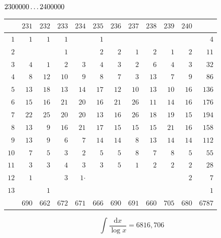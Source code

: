 \par\medskip
\noindent\begin{minipage}{\linewidth}\centering
{}
\(2300000\mathinner{.\,.\,.}2400000\)\par\smallskip
\begingroup\fontsize{10.5}{11.5}\selectfont\setlength{\tabcolsep}{3.5pt}\renewcommand{\arraystretch}{1}
\begin{tabular}{r|rrrrrrrrrr|r}\hline
 & $231$ & $232$ & $233$ & $234$ & $235$ & $236$ & $237$ & $238$ & $239$ & $240$ &  \\ \hline
$1$ & $1$ & $1$ & $1$ &  & $1$ &  &  &  &  &  & $4$ \\
$2$ &  &  & $1$ &  & $2$ & $2$ & $1$ & $2$ & $1$ & $2$ & $11$ \\
$3$ & $4$ & $1$ & $2$ & $3$ & $4$ & $3$ & $2$ & $6$ & $4$ & $3$ & $32$ \\
$4$ & $8$ & $12$ & $10$ & $9$ & $8$ & $7$ & $3$ & $13$ & $7$ & $9$ & $86$ \\
$5$ & $13$ & $18$ & $13$ & $14$ & $17$ & $12$ & $10$ & $13$ & $10$ & $16$ & $136$ \\
$6$ & $15$ & $16$ & $21$ & $20$ & $16$ & $21$ & $26$ & $11$ & $14$ & $16$ & $176$ \\
$7$ & $22$ & $25$ & $20$ & $20$ & $13$ & $16$ & $26$ & $18$ & $19$ & $15$ & $194$ \\
$8$ & $13$ & $9$ & $16$ & $21$ & $17$ & $15$ & $15$ & $15$ & $21$ & $16$ & $158$ \\
$9$ & $13$ & $9$ & $6$ & $7$ & $14$ & $14$ & $8$ & $13$ & $14$ & $14$ & $112$ \\
$10$ & $7$ & $5$ & $3$ & $2$ & $5$ & $5$ & $8$ & $7$ & $8$ & $5$ & $55$ \\
$11$ & $3$ & $3$ & $4$ & $3$ & $3$ & $5$ & $1$ & $2$ & $2$ & $2$ & $28$ \\
$12$ & $1$ &  & $3$ & $1\mathord{\cdot}$ &  &  &  &  &  & $2$ & $7$ \\
$13$ &  & $1$ &  &  &  &  &  &  &  &  & $1$ \\
\hline
 & $690$ & $662$ & $672$ & $671$ & $666$ & $690$ & $691$ & $660$ & $705$ & $680$ & $6787$ \\ \hline
\end{tabular}\par\endgroup
\setlength{\abovedisplayskip}{6pt}\setlength{\belowdisplayskip}{4pt}
\[\int\frac{\mathrm{d}x}{\log x}=6816{,}706\]
\end{minipage}

